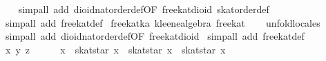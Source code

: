 \begin{isabellebody}
\ \ \isamarkupfalse%
\ {}simp{}all\ add{}\ dioid{}nat{}order{}def{}OF\ free{}kat{}dioid{}\ skat{}order{}def{}\isanewline
\ \ \isamarkupfalse%
\ {}simp{}all\ add{}\ free{}kat{}def{}%
\endisatagproof
{\isafoldproof}%
%
\isadelimproof
\isanewline
%
\endisadelimproof
\isanewline
{}\isamarkupfalse%
\ free{}kat{}ka{}\ {}kleene{}algebra\ free{}kat{}\isanewline
%
\isadelimproof
\ \ %
\endisadelimproof
%
\isatagproof
{}\isamarkupfalse%
\ unfold{}locales\isanewline
\ \ \isamarkupfalse%
\ {}simp{}all\ add{}\ dioid{}nat{}order{}def{}OF\ free{}kat{}dioid{}{}\isanewline
{}\isamarkupfalse%
\ {}simp{}all\ add{}\ free{}kat{}def{}\isanewline
\ \ \isamarkupfalse%
\ x\ y\ z\isanewline
\ \ \isamarkupfalse%
\ {}{}\ {}\ x\ {}\ skat{}star\ x\ {}\ skat{}star\ x\ {}\ skat{}star\ x{}\isanewline

\end{isabellebody}
